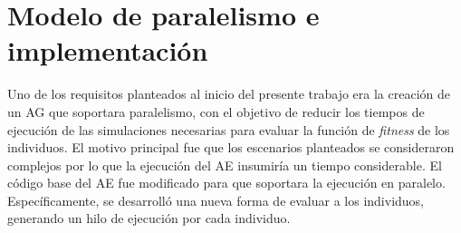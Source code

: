 \section{Modelo de paralelismo e implementación}





Uno de los requisitos planteados al inicio del presente trabajo era la creación de un AG que soportara paralelismo, con el objetivo de reducir los tiempos de ejecución de las simulaciones necesarias para evaluar la función de \emph{fitness} de los individuos. El motivo principal fue que los escenarios planteados se consideraron complejos por lo que la ejecución del AE insumiría un tiempo considerable. El código base del AE fue modificado para que soportara la ejecución en paralelo. Específicamente, se desarrolló una nueva forma de evaluar a los individuos, generando un hilo de ejecución por cada individuo.

